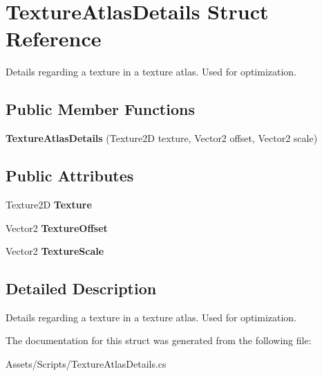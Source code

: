 \hypertarget{struct_texture_atlas_details}{}\section{Texture\+Atlas\+Details Struct Reference}
\label{struct_texture_atlas_details}


Details regarding a texture in a texture atlas. Used for optimization.  


\subsection*{Public Member Functions}
\begin{DoxyCompactItemize}
\item 
\hypertarget{struct_texture_atlas_details_a2f7bf8e8f938c12322f617d096731a17}{}{\bfseries Texture\+Atlas\+Details} (Texture2\+D texture, Vector2 offset, Vector2 scale)\label{struct_texture_atlas_details_a2f7bf8e8f938c12322f617d096731a17}

\end{DoxyCompactItemize}
\subsection*{Public Attributes}
\begin{DoxyCompactItemize}
\item 
\hypertarget{struct_texture_atlas_details_a6041dcc7eb9be0eda0f50bc4d8d52933}{}Texture2\+D {\bfseries Texture}\label{struct_texture_atlas_details_a6041dcc7eb9be0eda0f50bc4d8d52933}

\item 
\hypertarget{struct_texture_atlas_details_a370d51e1e8655ad77402490088d564aa}{}Vector2 {\bfseries Texture\+Offset}\label{struct_texture_atlas_details_a370d51e1e8655ad77402490088d564aa}

\item 
\hypertarget{struct_texture_atlas_details_ad11b9fed23520de7a020ed4ac389146a}{}Vector2 {\bfseries Texture\+Scale}\label{struct_texture_atlas_details_ad11b9fed23520de7a020ed4ac389146a}

\end{DoxyCompactItemize}


\subsection{Detailed Description}
Details regarding a texture in a texture atlas. Used for optimization. 



The documentation for this struct was generated from the following file\+:\begin{DoxyCompactItemize}
\item 
Assets/\+Scripts/Texture\+Atlas\+Details.\+cs\end{DoxyCompactItemize}
